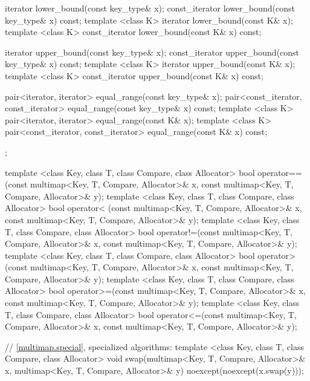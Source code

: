 \begin{codeblock}
{{    iterator       lower_bound(const key_type& x);
    const_iterator lower_bound(const key_type& x) const;
    template <class K> iterator       lower_bound(const K& x);
    template <class K> const_iterator lower_bound(const K& x) const;

    iterator       upper_bound(const key_type& x);
    const_iterator upper_bound(const key_type& x) const;
    template <class K> iterator       upper_bound(const K& x);
    template <class K> const_iterator upper_bound(const K& x) const;

    pair<iterator, iterator>               equal_range(const key_type& x);
    pair<const_iterator, const_iterator>   equal_range(const key_type& x) const;
    template <class K>
      pair<iterator, iterator>             equal_range(const K& x);
    template <class K>
      pair<const_iterator, const_iterator> equal_range(const K& x) const;
  };

  template <class Key, class T, class Compare, class Allocator>
    bool operator==(const multimap<Key, T, Compare, Allocator>& x,
                    const multimap<Key, T, Compare, Allocator>& y);
  template <class Key, class T, class Compare, class Allocator>
    bool operator< (const multimap<Key, T, Compare, Allocator>& x,
                    const multimap<Key, T, Compare, Allocator>& y);
  template <class Key, class T, class Compare, class Allocator>
    bool operator!=(const multimap<Key, T, Compare, Allocator>& x,
                    const multimap<Key, T, Compare, Allocator>& y);
  template <class Key, class T, class Compare, class Allocator>
    bool operator> (const multimap<Key, T, Compare, Allocator>& x,
                    const multimap<Key, T, Compare, Allocator>& y);
  template <class Key, class T, class Compare, class Allocator>
    bool operator>=(const multimap<Key, T, Compare, Allocator>& x,
                    const multimap<Key, T, Compare, Allocator>& y);
  template <class Key, class T, class Compare, class Allocator>
    bool operator<=(const multimap<Key, T, Compare, Allocator>& x,
                    const multimap<Key, T, Compare, Allocator>& y);

  // \ref{multimap.special}, specialized algorithms:
  template <class Key, class T, class Compare, class Allocator>
    void swap(multimap<Key, T, Compare, Allocator>& x,
              multimap<Key, T, Compare, Allocator>& y)
      noexcept(noexcept(x.swap(y)));
}
\end{codeblock}%
%

